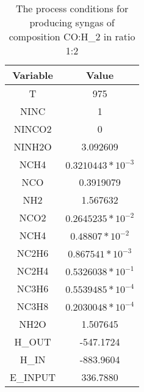 \documentclass[journal=iecred,manuscript=article]{achemso}
\begin{document}
\FloatBarrier
\begin{table}[H]
\caption{The process conditions for producing syngas of composition CO:H_2 in ratio 1:2} 
\centering
\begin{tabular}{|c|c|}
\hline\hline %
Variable & Value \\ 
[1ex] %
\hline %
T	& 975 \\
\hline
NINC	& 1 \\
\hline
NINCO2	& 0 \\
\hline
NINH2O	& 3.092609 \\
\hline
NCH4 &	$0.3210443*10^{-3}$ \\
\hline
NCO	& 0.3919079 \\
\hline
NH2 & 1.567632 \\
\hline
NCO2	& $0.2645235*10^{-2}$ \\
\hline
NCH4	& $0.48807*10^{-2}$ \\
\hline
NC2H6	& $0.867541*10^{-3}$ \\
\hline
NC2H4	& $0.5326038*10^{-1}$ \\
\hline
NC3H6	& $0.5539485*10^{-4}$ \\
\hline
NC3H8	& $0.2030048*10^{-4}$ \\
\hline
NH2O	& 1.507645 \\
\hline
H_{OUT}	& -547.1724 \\
\hline
H_{IN}	& -883.9604 \\
\hline
E_{INPUT}	& 336.7880 \\
\hline 

\end{tabular}
\end{table}
\FloatBarrier


\newpage
\end{document}
